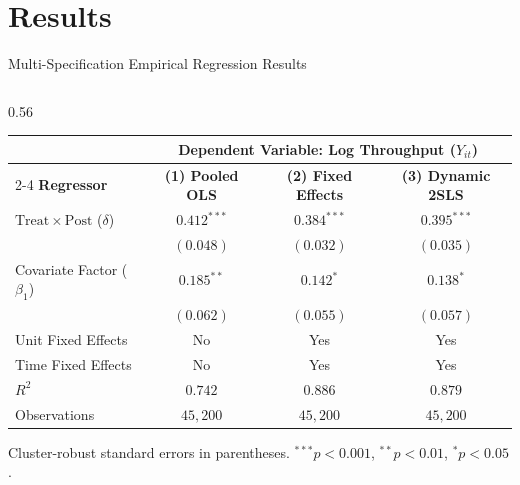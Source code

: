 \documentclass[aspectratio=169, 9pt]{beamer}
\begin{document}
\section{Results}
\begin{frame}{Multi-Specification Empirical Regression Results}
    \begin{columns}[c]
        \begin{column}{0.56\textwidth}
            \centering
            \setlength{\tabcolsep}{3.5pt}
            \scriptsize
            \begin{tabular}{@{} l c c c @{}}
                \toprule
                & \multicolumn{3}{c}{\textbf{Dependent Variable: Log Throughput ($Y_{it}$)}} \\
                \cmidrule(lr){2-4}
                \textbf{Regressor} & \textbf{(1) Pooled OLS} & \textbf{(2) Fixed Effects} & \textbf{(3) Dynamic 2SLS} \\
                \midrule
                $\mathrm{Treat} \times \mathrm{Post}$ ($\delta$) & $0.412^{***}$ & $0.384^{***}$ & $0.395^{***}$ \\
                                                                  & $(0.048)$     & $(0.032)$     & $(0.035)$     \\
                Covariate Factor ($\beta_1$)                     & $0.185^{**}$  & $0.142^{*}$   & $0.138^{*}$   \\
                                                                  & $(0.062)$     & $(0.055)$     & $(0.057)$     \\
                \midrule
                Unit Fixed Effects                                & No            & Yes           & Yes           \\
                Time Fixed Effects                                & No            & Yes           & Yes           \\
                $R^2$                                             & $0.742$       & $0.886$       & $0.879$       \\
                Observations                                      & $45{,}200$    & $45{,}200$    & $45{,}200$    \\
                \bottomrule
            \end{tabular}
            \par\vspace{2pt}
            {\tiny\textcolor{structure!70}{Cluster-robust standard errors in parentheses. $^{***}p<0.001$, $^{**}p<0.01$, $^{*}p<0.05$.}}

\end{column}
\end{columns}
\end{frame}
\end{document}
